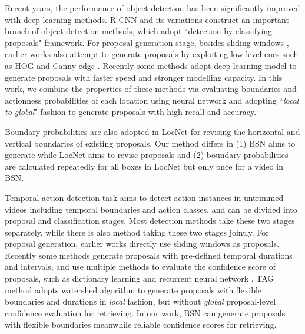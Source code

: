 \documentclass[runningheads]{llncs}
\begin{document}
Recent years, the performance of object detection has been significantly improved with deep learning methods. R-CNN \cite{girshick2014rich} and its variations \cite{girshick2015fastt,ren2015faster} construct an important branch of object detection methods, which adopt ``detection by classifying proposals" framework.
For proposal generation stage, besides sliding windows \cite{felzenszwalb2010object}, earlier works also attempt to generate proposals by exploiting low-level cues such as HOG and Canny edge \cite{uijlings2013selective,zitnick2014edge}. Recently some methods \cite{ren2015faster,kuo2015deepbox,lin2016feature} adopt deep learning model to generate proposals with faster speed  and stronger modelling capacity.
In this work, we combine the properties of these methods via evaluating boundaries and actionness probabilities of each location using neural network and adopting ``\emph{local to global}" fashion to generate proposals with high recall and accuracy.

Boundary probabilities are also adopted in LocNet \cite{gidaris2016locnet} for revising the horizontal and vertical boundaries of existing proposals. Our method differs in (1) BSN aims to generate while LocNet aims to revise proposals and (2) boundary probabilities are calculated repeatedly for all boxes  in LocNet but only once for a video  in BSN.


Temporal action detection task aims to detect action instances in untrimmed videos including temporal boundaries and action classes, and can be divided into proposal and classification stages.
Most detection methods \cite{shou2016action,singh2016untrimmed,zhao2017temporal} take these two stages separately, while there is also method \cite{ssad,sstad} taking these two stages jointly.
%
For proposal generation, earlier works \cite{karaman2014fast,oneata2014lear,wang2014action} directly use sliding windows as proposals. Recently some methods \cite{sst_buch_cvpr17,fast_temporal_activity_cvpr16,escorcia2016daps,gao2017turn,shou2016action} generate proposals with  pre-defined temporal durations and intervals, and use multiple methods to evaluate the confidence score of proposals, such as dictionary learning \cite{fast_temporal_activity_cvpr16} and recurrent neural network \cite{escorcia2016daps}.
TAG method \cite{zhao2017temporal} adopts watershed algorithm to generate proposals with flexible boundaries and durations in \emph{local} fashion, but without \emph{global} proposal-level confidence evaluation for retrieving. %
In our work, BSN can generate proposals with flexible boundaries meanwhile reliable confidence scores for retrieving.
\end{document}
